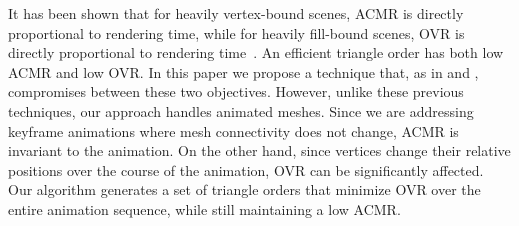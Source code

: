 It has been shown that for heavily vertex-bound scenes, ACMR is directly proportional to rendering time, while for heavily fill-bound scenes, OVR is directly proportional to rendering time~\citep{Sander07}. An efficient triangle order has both low ACMR and low OVR. In this paper we propose a technique that, as in \cite{Nehab06} and \cite{Sander07}, compromises between these two objectives. However, unlike these previous techniques, our approach handles animated meshes. Since we are addressing keyframe animations where mesh connectivity does not change, ACMR is invariant to the animation. On the other hand, since vertices change their relative positions over the course of the animation, OVR can be significantly affected. Our algorithm generates a set of triangle orders that minimize OVR over the entire animation sequence, while still maintaining a low ACMR.